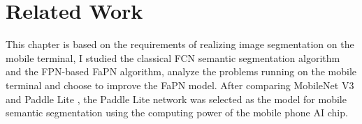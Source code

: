 \section{Related Work}
This chapter is based on the requirements of realizing image segmentation on the mobile terminal, I studied the classical FCN \cite{long2015fully} semantic segmentation algorithm and the FPN-based FaPN \cite{huang2021fapn} algorithm, analyze the problems running on the mobile terminal and choose to improve the FaPN model. After comparing MobileNet V3 and Paddle Lite \cite{paddlelite}, the Paddle Lite network was selected as the model for mobile semantic segmentation using the computing power of the mobile phone AI chip. 





